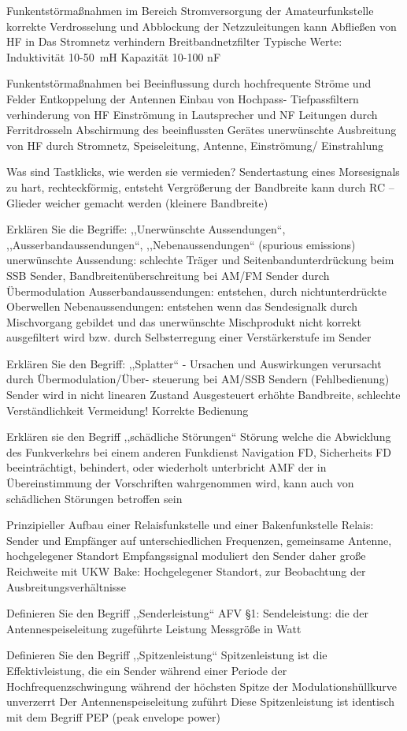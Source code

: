 \documentclass[avery5371,grid,frame,a4paper]{flashcards}
\newcommand{\card}[3]{
  \begin{flashcard}[{\chap} -- #1]{#2}#3\end{flashcard}
}
\begin{document}
\card{91}{Funkentstörmaßnahmen im Bereich Stromversorgung der Amateurfunkstelle}{
  korrekte Verdrosselung und Abblockung der
Netzzuleitungen kann Abfließen von HF in
Das Stromnetz verhindern
Breitbandnetzfilter
Typische Werte:
Induktivität 10-\SI{50}{\metre}H
Kapazität 10-100 nF
}
\card{92}{Funkentstörmaßnahmen bei Beeinflussung durch hochfrequente Ströme und Felder}{
  Entkoppelung der Antennen
Einbau von Hochpass- Tiefpassfiltern
verhinderung von HF Einströmung in
Lautsprecher und NF Leitungen durch
Ferritdrosseln
Abschirmung des beeinflussten Gerätes
unerwünschte Ausbreitung von HF durch
Stromnetz, Speiseleitung, Antenne,
Einströmung/ Einstrahlung
}
\card{93}{Was sind Tastklicks, wie werden sie vermieden?}{
  Sendertastung eines Morsesignals zu hart,
rechteckförmig, entsteht Vergrößerung der
Bandbreite
kann durch RC – Glieder weicher gemacht
werden (kleinere Bandbreite)
}
\card{94}{Erklären Sie die Begriffe: ,,Unerwünschte Aussendungen``, ,,Ausserbandaussendungen``, ,,Nebenaussendungen`` (spurious emissions)}{
  unerwünschte Aussendung: schlechte Träger
und Seitenbandunterdrückung beim SSB Sender,
 Bandbreitenüberschreitung bei AM/FM
Sender durch Übermodulation
Ausserbandaussendungen: entstehen, durch
nichtunterdrückte Oberwellen
Nebenaussendungen: entstehen wenn das
Sendesignalk durch Mischvorgang gebildet und das
unerwünschte Mischprodukt nicht korrekt ausgefiltert 
wird bzw. durch Selbsterregung einer Verstärkerstufe
im Sender
}
\card{95}{Erklären Sie den Begriff: ,,Splatter`` - Ursachen und Auswirkungen}{
  verursacht durch Übermodulation/Über-
steuerung bei AM/SSB Sendern
(Fehlbedienung)
Sender wird in nicht linearen Zustand
Ausgesteuert erhöhte Bandbreite, schlechte
Verständlichkeit
Vermeidung!  Korrekte Bedienung
}
\card{96}{Erklären sie den Begriff ,,schädliche Störungen``}{
  Störung welche die Abwicklung des Funkverkehrs
bei einem anderen Funkdienst Navigation FD,
Sicherheits FD beeinträchtigt, behindert, oder
wiederholt unterbricht
AMF der in Übereinstimmung der Vorschriften
wahrgenommen wird, kann auch von schädlichen
Störungen betroffen sein
}
\card{97}{Prinzipieller Aufbau einer Relaisfunkstelle und einer Bakenfunkstelle}{
  Relais: Sender und Empfänger auf 
unterschiedlichen Frequenzen, gemeinsame
Antenne, hochgelegener Standort
Empfangssignal moduliert den Sender
daher  große Reichweite mit UKW
Bake: Hochgelegener Standort, zur
Beobachtung der Ausbreitungsverhältnisse
}
\card{98}{Definieren Sie den Begriff ,,Senderleistung``}{
  AFV §1: Sendeleistung: die der Antennespeiseleitung zugeführte Leistung Messgröße in Watt
}
\card{99}{Definieren Sie den Begriff ,,Spitzenleistung``}{
  Spitzenleistung ist die Effektivleistung, die ein
Sender während einer Periode der 
Hochfrequenzschwingung während der höchsten
Spitze der Modulationshüllkurve unverzerrt
Der Antennenspeiseleitung zuführt
Diese Spitzenleistung ist identisch mit dem
Begriff PEP (peak envelope power)
}
\end{document}
